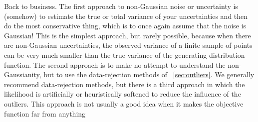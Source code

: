 \documentclass[12pt,twoside,pdftex]{article}
\begin{document}
Back to business.  The first approach to non-Gaussian noise or
uncertainty is (somehow) to estimate the true or total variance of
your uncertainties and then do the most conservative thing, which is
to once again assume that the noise is Gaussian!  This is the simplest
approach, but rarely possible, because when there are non-Gaussian
uncertainties, the observed variance of a finite sample of points can
be very much smaller than the true variance of the generating
distribution function.  The second approach is to make no attempt to
understand the non-Gaussianity, but to use the data-rejection methods
of \sectionname~\ref{sec:outliers}.  We generally recommend
data-rejection methods, but there is a third approach in which the
likelihood is artificially or heuristically softened to reduce the
influence of the outliers.  This approach is not usually a good idea
when it makes the objective function far from anything
\end{document}

